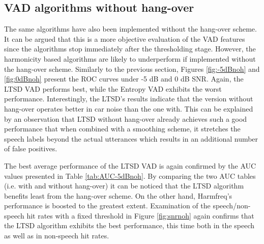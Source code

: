\subsection{VAD algorithms without hang-over}

The same algorithms have also been implemented without the hang-over scheme. It can be argued that this is a more objective evaluation of the VAD features since the algorithms stop immediately after the thresholding stage. However, the harmonicity based algorithms are likely to underperform if implemented without the hang-over scheme. Similarly to the previous section, Figures \ref{fig:-5dBnoh} and \ref{fig:0dBnoh} present the ROC curves under -5 dB and 0 dB SNR. Again, the LTSD VAD performs best, while the Entropy VAD exhibits the worst performance. Interestingly, the LTSD's results indicate that the version without hang-over operates better in car noise than the one with. This can be explained by an observation that LTSD without hang-over already achieves such a good performance that when combined with a smoothing scheme, it stretches the speech labels beyond the actual utterances which results in an additional number of false positives.

The best average performance of the LTSD VAD is again confirmed by the AUC values presented in Table \ref{tab:AUC-5dBnoh}. By comparing the two AUC tables (i.e. with and without hang-over) it can be noticed that the LTSD algorithm benefits least from the hang-over scheme. On the other hand, Harmfreq's performance is boosted to the greatest extent. Examination of the speech/non-speech hit rates with a fixed threshold in Figure \ref{fig:snrnoh} again confirms that the LTSD algorithm exhibits the best performance, this time both in the speech as well as in non-speech hit rates.

